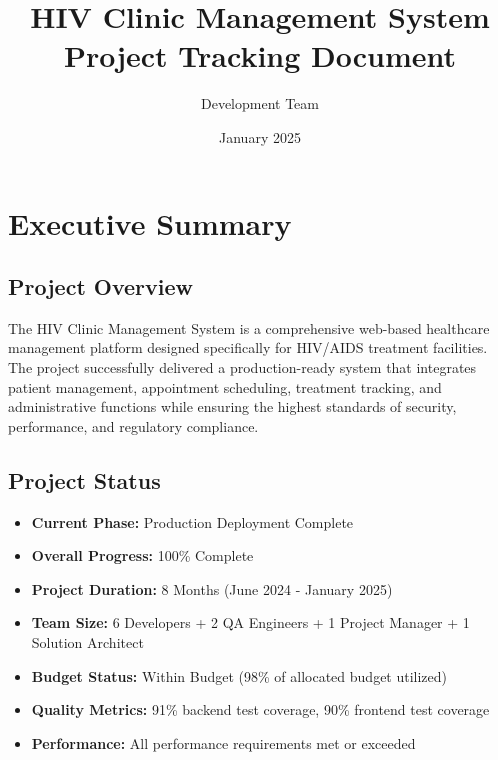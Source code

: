 \documentclass[12pt,a4paper]{article}
\title{\textbf{HIV Clinic Management System \\
Project Tracking Document}}
\author{Development Team}
\date{January 2025}
\begin{document}
\maketitle

\tableofcontents
\newpage

\section{Executive Summary}

\subsection{Project Overview}
The HIV Clinic Management System is a comprehensive web-based healthcare management platform designed specifically for HIV/AIDS treatment facilities. The project successfully delivered a production-ready system that integrates patient management, appointment scheduling, treatment tracking, and administrative functions while ensuring the highest standards of security, performance, and regulatory compliance.

\subsection{Project Status}
\begin{itemize}
    \item \textbf{Current Phase:} Production Deployment Complete
    \item \textbf{Overall Progress:} 100\% Complete
    \item \textbf{Project Duration:} 8 Months (June 2024 - January 2025)
    \item \textbf{Team Size:} 6 Developers + 2 QA Engineers + 1 Project Manager + 1 Solution Architect
    \item \textbf{Budget Status:} Within Budget (98\% of allocated budget utilized)
    \item \textbf{Quality Metrics:} 91\% backend test coverage, 90\% frontend test coverage
    \item \textbf{Performance:} All performance requirements met or exceeded
\end{itemize}
\end{document}
